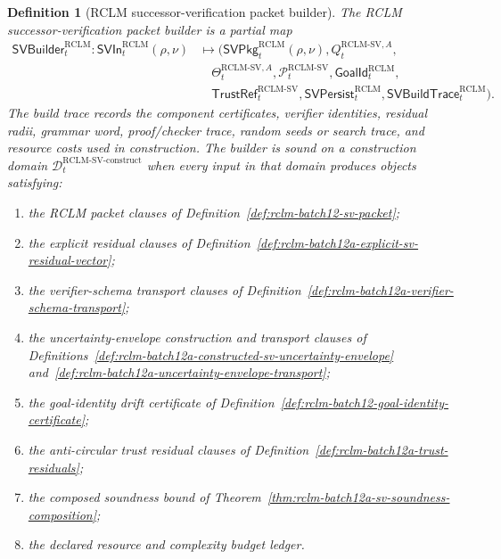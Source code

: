 \documentclass[11pt,a4paper]{article}
\newtheorem{definition}[theorem]{Definition}
\newcommand{\Pcal}{\mathcal P}
\newcommand{\Dcal}{\mathcal D}
\newcommand{\RCLM}{\mathrm{RCLM}}
\begin{document}
\begin{definition}[RCLM successor-verification packet builder]
\label{def:rclm-batch12b-sv-packet-builder}
The RCLM successor-verification packet builder is a partial map
\[
\begin{aligned}
\mathsf{SVBuilder}_t^{\RCLM}
:
\mathsf{SVIn}_t^{\RCLM}(\rho,\nu)
&\longmapsto
(\mathsf{SVPkg}_t^{\RCLM}(\rho,\nu),
Q_t^{\RCLM\text{-}\mathrm{SV},A},\\
&\quad
\Theta_t^{\RCLM\text{-}\mathrm{SV},A},
\Pcal_t^{\RCLM\text{-}\mathrm{SV}},
\mathsf{GoalId}_t^{\RCLM},\\
&\quad
\mathsf{TrustRef}_t^{\RCLM\text{-}\mathrm{SV}},
\mathsf{SVPersist}_t^{\RCLM},
\mathsf{SVBuildTrace}_t^{\RCLM}).
\end{aligned}
\]
The build trace records the component certificates, verifier identities, residual radii, grammar word, proof/checker trace, random seeds or search trace, and resource costs used in construction.  The builder is sound on a construction domain \(\Dcal_t^{\RCLM\text{-}\mathrm{SV\mbox{-}construct}}\) when every input in that domain produces objects satisfying:
\begin{enumerate}[label=(\roman*),leftmargin=1.5em]
    \item the RCLM packet clauses of Definition~\ref{def:rclm-batch12-sv-packet};
    \item the explicit residual clauses of Definition~\ref{def:rclm-batch12a-explicit-sv-residual-vector};
    \item the verifier-schema transport clauses of Definition~\ref{def:rclm-batch12a-verifier-schema-transport};
    \item the uncertainty-envelope construction and transport clauses of Definitions~\ref{def:rclm-batch12a-constructed-sv-uncertainty-envelope} and~\ref{def:rclm-batch12a-uncertainty-envelope-transport};
    \item the goal-identity drift certificate of Definition~\ref{def:rclm-batch12-goal-identity-certificate};
    \item the anti-circular trust residual clauses of Definition~\ref{def:rclm-batch12a-trust-residuals};
    \item the composed soundness bound of Theorem~\ref{thm:rclm-batch12a-sv-soundness-composition};
    \item the declared resource and complexity budget ledger.
\end{enumerate}
\end{definition}
\end{document}

